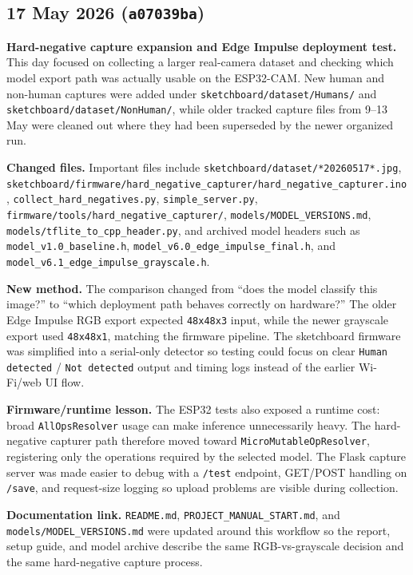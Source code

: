 \documentclass[11pt,a4paper]{article}
\begin{document}
\subsection{17 May 2026 (\texttt{a07039ba})}
\textbf{Hard-negative capture expansion and Edge Impulse deployment test.} This day focused on collecting a larger real-camera dataset and checking which model export path was actually usable on the ESP32-CAM. New human and non-human captures were added under \texttt{sketchboard/dataset/Humans/} and \texttt{sketchboard/dataset/NonHuman/}, while older tracked capture files from 9--13 May were cleaned out where they had been superseded by the newer organized run.

\textbf{Changed files.} Important files include \texttt{sketchboard/dataset/*20260517*.jpg}, \texttt{sketchboard/firmware/hard\_negative\_capturer/hard\_negative\_capturer.ino}, \texttt{collect\_hard\_negatives.py}, \texttt{simple\_server.py}, \texttt{firmware/tools/hard\_negative\_capturer/}, \texttt{models/MODEL\_VERSIONS.md}, \texttt{models/tflite\_to\_cpp\_header.py}, and archived model headers such as \texttt{model\_v1.0\_baseline.h}, \texttt{model\_v6.0\_edge\_impulse\_final.h}, and \texttt{model\_v6.1\_edge\_impulse\_grayscale.h}.

\textbf{New method.} The comparison changed from ``does the model classify this image?'' to ``which deployment path behaves correctly on hardware?'' The older Edge Impulse RGB export expected \texttt{48x48x3} input, while the newer grayscale export used \texttt{48x48x1}, matching the firmware pipeline. The sketchboard firmware was simplified into a serial-only detector so testing could focus on clear \texttt{Human detected} / \texttt{Not detected} output and timing logs instead of the earlier Wi-Fi/web UI flow.

\textbf{Firmware/runtime lesson.} The ESP32 tests also exposed a runtime cost: broad \texttt{AllOpsResolver} usage can make inference unnecessarily heavy. The hard-negative capturer path therefore moved toward \texttt{MicroMutableOpResolver}, registering only the operations required by the selected model. The Flask capture server was made easier to debug with a \texttt{/test} endpoint, GET/POST handling on \texttt{/save}, and request-size logging so upload problems are visible during collection.

\textbf{Documentation link.} \texttt{README.md}, \texttt{PROJECT\_MANUAL\_START.md}, and \texttt{models/MODEL\_VERSIONS.md} were updated around this workflow so the report, setup guide, and model archive describe the same RGB-vs-grayscale decision and the same hard-negative capture process.
\end{document}
